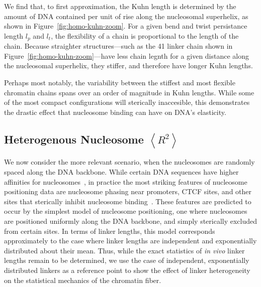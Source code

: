 \documentclass[%
 reprint,
superscriptaddress,
showpacs,preprintnumbers,
 amsmath,amssymb,
 aps,
 prl,
]{revtex4-1}
\newcommand{\RR}{\left\langle{}R^2\right\rangle{}}
\begin{document}
We find that, to first approximation, the Kuhn length is determined by the
    amount of DNA contained per unit of rise along the nucleosomal superhelix,
    as shown in Figure~\ref{fig:homo-kuhn-zoom}.
For a given bend and twist persistance length $l_p$ and $l_t$, the flexibility
    of a chain is proportional to the length of the chain.
Because straighter structures---such as the \SI{41}{\basepair} linker chain
    shown in Figure~\ref{fig:homo-kuhn-zoom}---have less chain legnth for a
    given distance along  the nucleosomal superhelix, they stiffer, and
    therefore have longer Kuhn lengths.

Perhaps most notably, the variability between the stiffest and most flexible
    chromatin chains spans over an order of magnitude in Kuhn lengths.
While some of the most compact configurations will sterically inaccesible, this
    demonstrates the drastic effect that nucleosome binding can have on DNA's
    elasticity.

\subsection{\label{sec:homo-kuhn}Heterogenous Nucleosome $\RR$}

We now consider the more relevant scenario, when the nucleosomes are randomly
    spaced along the DNA backbone.
While certain DNA sequences have higher affinities for
    nucleosomes~\cite{something widom}, in practice the most striking features
    of nucleosome positioning data are nucleosome phasing near promoters, CTCF
    sites, and other sites that sterically inhibit nucleosome
    binding~\cite{widom1992}.
These features are predicted to occur by the simplest model of nucleosome
    positioning, one where nucleosomes are positioned uniformly along the DNA
    backbone, and simply sterically excluded from certain sites.
In terms of linker lengths, this model corresponds approximately to the case
    where linker lengths are independent and exponentially distributed about
    their mean.
Thus, while the exact statistics of \textit{in vivo} linker lengths remain to be
    determined, we use the case of independent, exponentially distributed
    linkers as a reference point to show the effect of linker heterogeneity on
    the statistical mechanics of the chromatin fiber.
\end{document}
